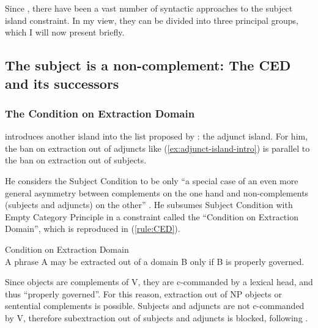 Since \citet{Chomsky.1973}, there have been a vast number of syntactic approaches to the subject island constraint. In my view, they can be divided into three principal groups, which I will now present briefly.


\subsection{The subject is a non-complement: The CED and its successors}

\subsubsection{The Condition on Extraction Domain}

\citet{Huang.1982} introduces another island into the list proposed by \citet{Ross.1967}: the adjunct island. For him, the ban on extraction out of adjuncts like (\ref{ex:adjunct-island-intro}) is parallel to the ban on extraction out of subjects. 

\label{ex:adjunct-island-intro}
\z 

He considers the Subject Condition to be only ``a special case of an even more general asymmetry between complements on the one hand and non-complements (subjects and adjuncts) on the other'' \citep[503]{Huang.1982}. He subsumes  Subject Condition with   Empty Category Principle in a constraint called the ``Condition on Extraction Domain'', which is reproduced in (\ref{rule:CED}). 


\ea Condition on Extraction Domain \citep[505]{Huang.1982}\\
A phrase A may be extracted out of a domain B only if B
is properly governed.
\label{rule:CED}
\z 

Since objects are complements of V, they are c-commanded by a lexical head, and thus ``properly governed''. For this reason, extraction out of NP objects or sentential complements is possible. Subjects and adjuncts are not c-commanded by V, therefore subextraction out of subjects and adjuncts is blocked, following \citeauthor{Huang.1982}.

